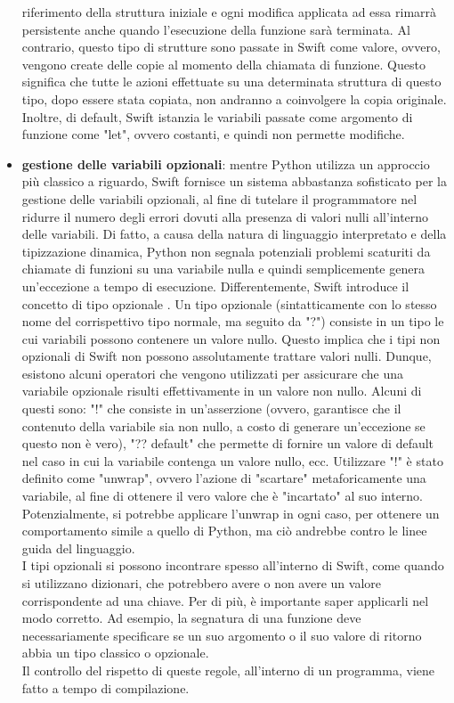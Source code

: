 \begin{itemize}
    riferimento della struttura iniziale e ogni modifica applicata ad
    essa rimarrà persistente anche quando l'esecuzione della funzione sarà 
   	terminata. Al contrario, questo tipo di strutture sono passate in 
   	Swift come valore, ovvero, vengono create delle copie al momento della
   	chiamata di funzione. Questo significa che tutte le azioni effettuate
    su una determinata struttura di questo tipo, dopo essere stata copiata, 
    non andranno a coinvolgere la copia originale. Inoltre, di default, Swift
    istanzia le variabili passate come argomento di funzione come "let",
    ovvero costanti, e quindi non permette modifiche.
    \item \textbf{gestione delle variabili opzionali}: mentre Python utilizza un
    approccio più classico a riguardo, Swift fornisce un sistema
    abbastanza sofisticato per la gestione delle variabili opzionali,
    al fine di tutelare il programmatore nel ridurre il numero degli errori
    dovuti alla presenza di valori nulli all'interno delle variabili.
    Di fatto, a causa della natura di linguaggio interpretato e della
    tipizzazione dinamica, Python non segnala potenziali problemi scaturiti
    da chiamate di funzioni su una variabile nulla e quindi semplicemente 
    genera un'eccezione a tempo di esecuzione. Differentemente, Swift
    introduce il concetto di tipo opzionale \cite{empirical_study_usage_swift}. 
    Un tipo opzionale (sintatticamente
    con lo stesso nome del corrispettivo tipo normale, ma seguito da "?") consiste 
    in un tipo le cui variabili possono contenere un valore nullo. Questo implica
    che i tipi non opzionali di Swift non possono assolutamente trattare 
    valori nulli. Dunque, esistono alcuni operatori che vengono utilizzati
    per assicurare che una variabile opzionale risulti effettivamente in un 
    valore non nullo. Alcuni di questi sono: "!" che consiste in un'asserzione
    (ovvero, garantisce che il contenuto della variabile sia non nullo, a costo 
    di generare un'eccezione se questo non è vero), "?? default" che permette
    di fornire un valore di default nel caso in cui la variabile contenga un 
    valore nullo, ecc. Utilizzare "!" è stato definito come "unwrap", ovvero
    l'azione di "scartare" metaforicamente una variabile, al fine di ottenere
    il vero valore che è "incartato" al suo interno. Potenzialmente, si 
    potrebbe applicare l'unwrap in ogni caso, per ottenere un comportamento 
    simile a quello di Python, ma ciò andrebbe contro le linee guida del
    linguaggio. \\
    I tipi opzionali si possono incontrare spesso all'interno di Swift, come 
    quando si utilizzano dizionari, che potrebbero avere o non avere un valore
    corrispondente ad una chiave. Per di più, è importante saper applicarli
    nel modo corretto. Ad esempio, la segnatura di una funzione deve 
    necessariamente specificare se un suo argomento o il suo valore di 
    ritorno abbia un tipo classico o opzionale.\\
    Il controllo del rispetto di queste regole, all'interno di un programma,
    viene fatto a tempo di compilazione.
    
\end{itemize}

